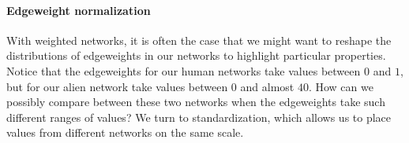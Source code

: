 \documentclass[letterpaper,10pt,english]{jupyterBook}
\begin{document}
\paragraph{Edge\sphinxhyphen{}weight normalization}
\label{\detokenize{representations/ch4/regularization:edge-weight-normalization}}
\sphinxAtStartPar
With weighted networks, it is often the case that we might want to reshape the distributions of edge\sphinxhyphen{}weights in our networks to highlight particular properties. Notice that the edge\sphinxhyphen{}weights for our human networks take values between \(0\) and \(1\), but for our alien network take values between \(0\) and almost \(40\). How can we possibly compare between these two networks when the edge\sphinxhyphen{}weights take such different ranges of values? We turn to standardization, which allows us to place values from different networks on the same scale.
\end{document}
